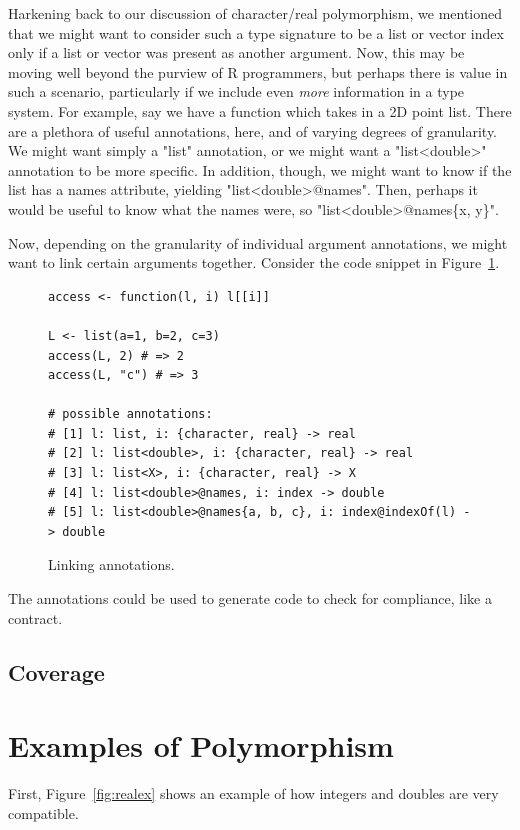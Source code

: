 \documentclass[acmsmall,10pt,review,anonymous]{acmart}\settopmatter{printfolios=true,printccs=false,printacmref=false}
\begin{document}
Harkening back to our discussion of character/real polymorphism, we mentioned that we might want to consider such a type signature to be a list or vector index only if a list or vector was present as another argument.
Now, this may be moving well beyond the purview of R programmers, but perhaps there is value in such a scenario, particularly if we include even {\it more} information in a type system.
For example, say we have a function which takes in a 2D point list.
There are a plethora of useful annotations, here, and of varying degrees of granularity.
We might want simply a "list" annotation, or we might want a "list<double>" annotation to be more specific.
In addition, though, we might want to know if the list has a names attribute, yielding "list<double>@names".
Then, perhaps it would be useful to know what the names were, so "list<double>@names\{x, y\}".

Now, depending on the granularity of individual argument annotations, we might want to link certain arguments together.
Consider the code snippet in Figure~\ref{fig:indexof}.
\begin{figure}[!hb]{\small\begin{lstlisting}[style=R]
access <- function(l, i) l[[i]]

L <- list(a=1, b=2, c=3)
access(L, 2) # => 2
access(L, "c") # => 3

# possible annotations:
# [1] l: list, i: {character, real} -> real
# [2] l: list<double>, i: {character, real} -> real
# [3] l: list<X>, i: {character, real} -> X
# [4] l: list<double>@names, i: index -> double
# [5] l: list<double>@names{a, b, c}, i: index@indexOf(l) -> double
\end{lstlisting}}\caption{Linking annotations.}\label{fig:indexof}\end{figure}
The annotations could be used to generate code to check for compliance, like a contract.

%
%
%
%
\subsection{Coverage}


%
%
%
\section{Examples of Polymorphism}
\label{sec:polyex}


First, Figure~\ref{fig:realex} shows an example of how integers and doubles
are very compatible.  
\end{document}
